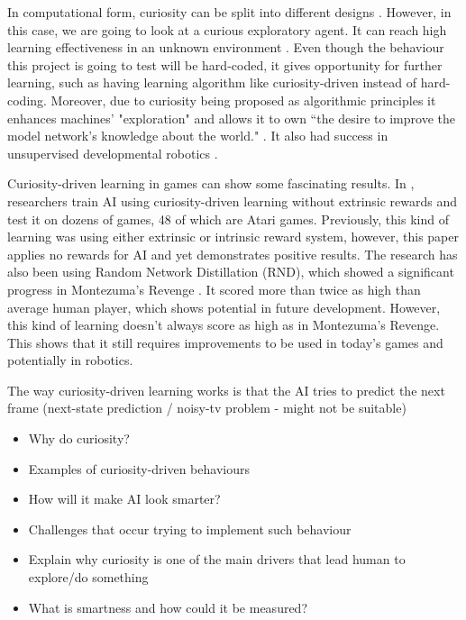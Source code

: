 \documentclass[journal]{IEEEtran}
\begin{document}
In computational form, curiosity can be split into different designs \cite{wu2013curiosity}. However, in this case, we are going to look at a curious exploratory agent. It can reach high learning effectiveness in an unknown environment \cite{wu2013curiosity}\cite{macedo2005role}. Even though the behaviour this project is going to test will be hard-coded, it gives opportunity for further learning, such as having learning algorithm like curiosity-driven instead of hard-coding. Moreover, due to curiosity being proposed as algorithmic principles \cite{wu2013curiosity}\cite{pang2009curiosity}\cite{karaoguz2011curiosity} it enhances machines' "exploration" and allows it to own ``the desire to improve the model network's knowledge about the world." \cite{schmidhuber1991possibility}. It also had success in unsupervised developmental robotics \cite{schmidhuber2006developmental}\cite{oudeyer2004intelligent}.

Curiosity-driven learning in games can show some fascinating results. In \cite{burda2018large}, researchers train AI using curiosity-driven learning without extrinsic rewards and test it on dozens of games, 48 of which are Atari games. Previously, this kind of learning was using either extrinsic or intrinsic reward system, however, this paper applies no rewards for AI and yet demonstrates positive results. The research has also been using Random Network Distillation (RND), which showed a significant progress in Montezuma's Revenge \cite{openairl}. It scored more than twice as high than average human player, which shows potential in future development. However, this kind of learning doesn't always score as high as in Montezuma's Revenge. This shows that it still requires improvements to be used in today's games and potentially in robotics.

The way curiosity-driven learning works is that the AI tries to predict the next frame (next-state prediction / noisy-tv problem - might not be suitable)
\begin{itemize}
	\item Why do curiosity?
	\item Examples of curiosity-driven behaviours
	\item How will it make AI look smarter?
	\item Challenges that occur trying to implement such behaviour
	\item Explain why curiosity is one of the main drivers that lead human to explore/do something
	\item What is smartness and how could it be measured?
\end{itemize}
\end{document}
